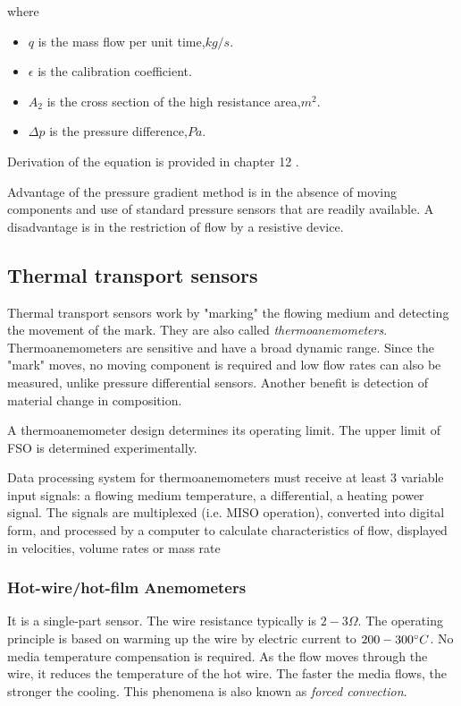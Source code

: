 where
\begin{itemize}
	\item $ q $ is the mass flow per unit time,$ \unit{kg/s} $.
	\item $ \epsilon $ is the calibration coefficient.
	\item $ A_2 $ is the cross section of the high resistance area,$ \unit{m^2} $.
	\item $ \Delta p$ is the pressure difference,$\unit{Pa} $.
\end{itemize}

Derivation of the equation is provided in chapter 12 \cite{handbook}.

Advantage of the pressure gradient method is in the absence of moving components and use of standard pressure sensors that are readily available. A disadvantage is in the restriction of flow by a resistive device.

\subsection{Thermal transport sensors}
Thermal transport sensors work by "marking" the flowing medium and detecting the movement of the mark. They are also called \textit{thermoanemometers}. Thermoanemometers are sensitive and have a broad dynamic range. Since the "mark" moves, no moving component is required and low flow rates can also be measured, unlike pressure differential sensors. Another benefit is detection of material change in composition.

A thermoanemometer design determines its operating limit. The upper limit of FSO is determined experimentally.

Data processing system for thermoanemometers must receive at least 3 variable input signals: a flowing medium temperature, a differential, a heating power signal. The signals are multiplexed (i.e. MISO operation), converted into digital form, and processed by a computer to calculate characteristics of flow, displayed in velocities, volume rates or mass rate
\subsubsection{Hot-wire/hot-film Anemometers}
It is a single-part sensor. The wire resistance typically is $ 2-3 \unit{\Omega} $. The operating principle is based on warming up the wire by electric current to $ 200-300^\circ C $. No media temperature compensation is required. As the flow moves through the wire, it reduces the temperature of the hot wire. The faster the media flows, the stronger the cooling. This phenomena is also known as \textit{forced convection}.

